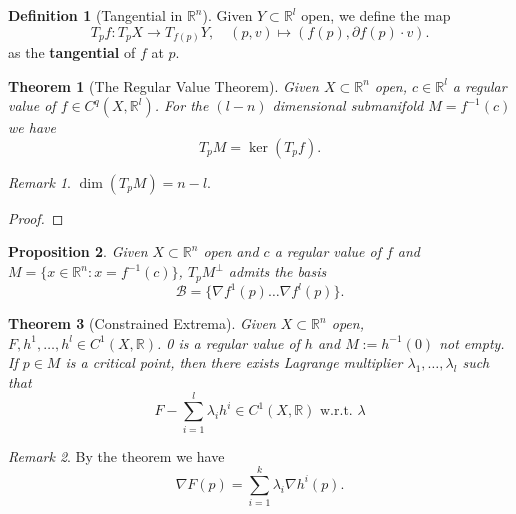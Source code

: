\documentclass[a4paper,11pt,fleqn, draft]{book}
\newtheorem{theorem}{Theorem}[section]
\newtheorem{proposition}[theorem]{Proposition}
\theoremstyle{definition}
\newtheorem{definition}{Definition}[section]
\theoremstyle{remark}
\newtheorem*{remark}{Remark}
\newcommand{\Rn}{\mathbb{R}^n}
\begin{document}
\begin{definition}[Tangential in $\mathbb{R}^n$]
	Given $Y \subset \mathbb{R}^l$ open, we define the map
	\begin{equation*}
		T_p f: T_pX \rightarrow T_{f(p)} Y, \quad (p, v) \mapsto (f(p), \partial f(p) \cdot v). 
	\end{equation*}
	as the \textbf{tangential} of $f$ at $p$. 
\end{definition}

\begin{theorem}[The Regular Value Theorem]
	Given $X \subset \mathbb{R}^n$ \textit{open}, $c \in \mathbb{R}^l$ a regular value of $f \in C^q(X, \mathbb{R}^l)$. For the $(l - n)$ dimensional submanifold $M = f^{-1}(c)$ we have 
	\begin{equation}
		T_p M = \ker (T_p f). 
	\end{equation}
\end{theorem}
\begin{remark}
$\dim (T_p M) = n - l$. 	
\end{remark}
\begin{proof}
\end{proof}

\begin{proposition}
	Given $X \subset \mathbb{R}^n$ open and $c$ a regular value of $f$ and $M = \{ x \in \Rn: x = f^{-1}(c)\}$,  $T_p M^\perp$ admits the basis
	\begin{equation}
		\mathcal{B} = \{ \nabla f^1(p) \dots \nabla f^l(p) \}. 
	\end{equation}
\end{proposition}


\begin{theorem}[Constrained Extrema]
	Given $X \subset \mathbb{R}^n$ open, $F, h^1, \dots, h^l \in C^1(X, \mathbb{R})$. 0 is a regular value of $h$ and $M:= h^{-1}(0)$ not empty. If $p \in M$ is a critical point, then there exists \textit{Lagrange multiplier} $\lambda_1 ,\dots, \lambda_l$ such that 
	\begin{equation}
		F - \sum_{i = 1}^l \lambda_i h^i \in C^1(X, \mathbb{R}) \text{ w.r.t. }\lambda
	\end{equation} 
\end{theorem}
\begin{remark}
By the theorem we have
\begin{equation}
	\nabla F(p) = \sum_{i = 1}^k \lambda_i \nabla h^i(p).
\end{equation}	
\end{remark}
\end{document}
